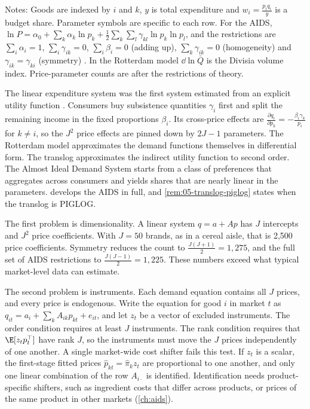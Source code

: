 \begin{table}[htbp]
\vspace{3pt}
\begin{minipage}{0.97\textwidth}
\footnotesize Notes: Goods are indexed by $i$ and $k$, $y$ is total expenditure and $w_i = \frac{p_iq_i}{y}$ is a
budget share. Parameter symbols are specific to each row. For the AIDS, $\ln P = \alpha_0 + \sum_k\alpha_k\ln p_k
+ \frac{1}{2}\sum_k\sum_l\gamma_{kl}\ln p_k\ln p_l$, and the restrictions are $\sum_i\alpha_i = 1$,
$\sum_i\gamma_{ik} = 0$, $\sum_i\beta_i = 0$ (adding up), $\sum_k\gamma_{ik} = 0$ (homogeneity) and $\gamma_{ik} =
\gamma_{ki}$ (symmetry) \citep[eqs.~8--12]{DeatonMuellbauer1980a}. In the Rotterdam model $\dd\ln\bar Q$ is the
Divisia volume index. Price-parameter counts are after the restrictions of theory.
\end{minipage}
\end{table}

The linear expenditure system was the first system estimated from an explicit utility function
\citep[p.~312]{DeatonMuellbauer1980a}. Consumers buy subsistence quantities $\gamma_i$ first and split the remaining
income in the fixed proportions $\beta_i$. Its cross-price effects are $\frac{\partial q_i}{\partial p_k} =
-\frac{\beta_i\gamma_k}{p_i}$ for $k \neq i$, so the $J^2$ price effects are pinned down by $2J - 1$ parameters. The
Rotterdam model approximates the demand functions themselves in differential form. The translog approximates the
indirect utility function to second order. The Almost Ideal Demand System starts from a class of preferences that
aggregates across consumers and yields shares that are nearly linear in the parameters.  develops the
AIDS in full, and \cref{rem:05-translog-piglog} states when the translog is PIGLOG.

The first problem is dimensionality. A linear system $q = a + Ap$ has $J$ intercepts and $J^2$ price
coefficients. With $J = 50$ brands, as in a cereal aisle, that is 2,500 price coefficients. Symmetry reduces the
count to $\frac{J(J+1)}{2} = 1{,}275$, and the full set of AIDS restrictions to $\frac{J(J-1)}{2} = 1{,}225$. These
numbers exceed what typical market-level data can estimate.

The second problem is instruments. Each demand equation contains all $J$ prices, and every price is endogenous. Write
the equation for good $i$ in market $t$ as $q_{it} = a_i + \sum_k A_{ik}p_{kt} + e_{it}$, and let $z_t$ be a vector
of excluded instruments. The order condition requires at least $J$ instruments. The rank condition requires that
$\E[z_t p_t^\top]$ have rank $J$, so the instruments must move the $J$ prices independently of one another. A single
market-wide cost shifter fails this test. If $z_t$ is a scalar, the first-stage fitted prices $\hat p_{kt} =
\hat\pi_k z_t$ are proportional to one another, and only one linear combination of the row $A_{i\cdot}$ is
identified. Identification needs product-specific shifters, such as ingredient costs that differ across products,
or prices of the same product in other markets (\cref{ch:aids}).


